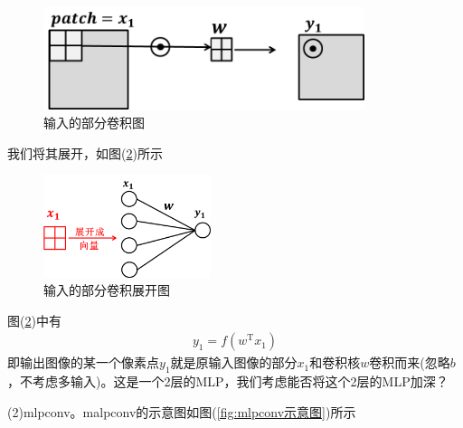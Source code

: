             \begin{figure}[H]
            \centering
            \includegraphics[height=3cm]{images/input_the_partial_convolution_graph.jpg}
            \caption{输入的部分卷积图}
            \label{fig:输入的部分卷积图}
            \end{figure}
            我们将其展开，如图(\ref{fig:输入的部分卷积展开图})所示
            \begin{figure}[H]
            \centering
            \includegraphics[height=3cm]{images/input_the_partial_convolution_unfold_graph.jpg}
            \caption{输入的部分卷积展开图}
            \label{fig:输入的部分卷积展开图}
            \end{figure}
            图(\ref{fig:输入的部分卷积展开图})中有
            \begin{align*}
            y_1 = f(w^\mathrm{T}x_1)
            \end{align*}
            即输出图像的某一个像素点$y_1$就是原输入图像的部分$x_1$和卷积核$w$卷积而来(忽略$b$，不考虑多输入)。这是一个2层的MLP，我们考虑能否将这个2层的MLP加深？
            \par
            (2)mlpconv。malpconv的示意图如图(\ref{fig:mlpconv示意图})所示
